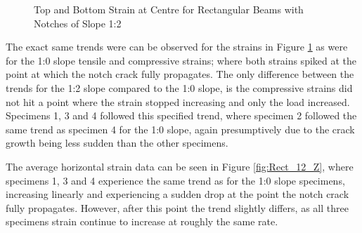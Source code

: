 \documentclass[11pt,a4paper]{article}
\numberwithin{equation}{subsection}
\begin{document}
\begin{figure}[h]
	\begin{center}
	\end{center}
	\caption{Top and Bottom Strain at Centre for Rectangular Beams with Notches of Slope 1:2}
	\label{fig:Rect_12_centre}
\end{figure}
\pagebreak

\noindent
The exact same trends were can be observed for the strains in Figure \ref{fig:Rect_12_centre} as were for the 1:0 slope tensile and compressive strains; where both strains spiked at the point at which the notch crack fully propagates. The only difference between the trends for the 1:2 slope compared to the 1:0 slope, is the compressive strains did not hit a point where the strain stopped increasing and only the load increased. Specimens 1, 3 and 4 followed this specified trend, where specimen 2 followed the same trend as specimen 4 for the 1:0 slope, again presumptively due to the crack growth being less sudden than the other specimens.

\vspace*{\baselineskip}
\noindent
The average horizontal strain data can be seen in Figure \ref{fig:Rect_12_Z}, where specimens 1, 3 and 4 experience the same trend as for the 1:0 slope specimens, increasing linearly and experiencing a sudden drop at the point the notch crack fully propagates. However, after this point the trend slightly differs, as all three specimens strain continue to increase at roughly the same rate. 
\end{document}
